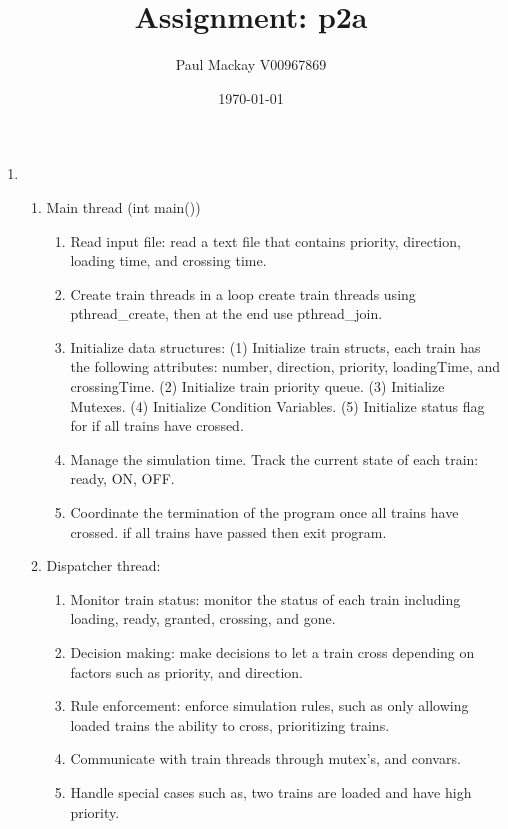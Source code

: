 \documentclass[10pt]{article}
\begin{document}
\title{Assignment: p2a}
\author{Paul Mackay V00967869}
\date{\today}

\maketitle

\begin{enumerate}
    \item 
        \begin{enumerate}
            \item Main thread (int main()) 
                \begin{enumerate}
                    \item Read input file: read a text file that contains
                        priority, direction, loading time, and crossing time.
                    \item Create train threads 
                        in a loop create train threads using pthread\_create, then
                        at the end use pthread\_join.
                    \item Initialize data structures: 
                        (1) Initialize train structs, each train has the following attributes: number,
                        direction, priority, loadingTime, and crossingTime.
                        (2) Initialize train priority queue.
                        (3) Initialize Mutexes.
                        (4) Initialize Condition Variables.
                        (5) Initialize status flag for if all trains have crossed.
                    \item Manage the simulation time.
                        Track the current state of each train: ready, ON, OFF. 
                    \item Coordinate the termination of the program once all trains have crossed.
                        if all trains have passed then exit program.
                \end{enumerate}
            \item Dispatcher thread: 
                \begin{enumerate}
                    \item Monitor train status: monitor the status of each train
                        including loading, ready, granted, crossing, and gone.
                    \item Decision making: make decisions to let a train cross
                        depending on factors such as priority, and direction.
                    \item
                        Rule enforcement: enforce simulation rules, such as
                        only allowing loaded trains the ability to cross, 
                        prioritizing trains.
                    \item
                        Communicate with train threads through mutex's, and convars.
                    \item
                        Handle special cases such as, two trains are loaded and
                        have high priority. 


\end{enumerate}
\end{enumerate}
\end{enumerate}
\end{document}
